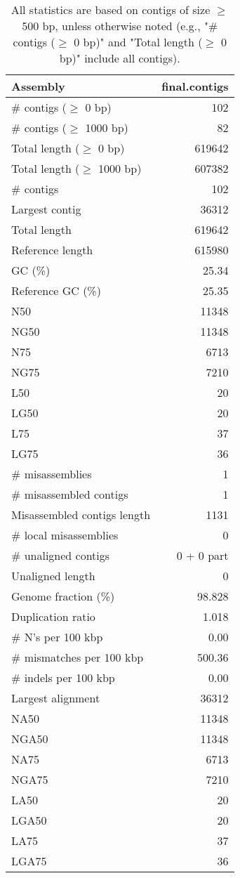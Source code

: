 \documentclass[12pt,a4paper]{article}
\begin{document}
\begin{table}[ht]
\begin{center}
\caption{All statistics are based on contigs of size $\geq$ 500 bp, unless otherwise noted (e.g., "\# contigs ($\geq$ 0 bp)" and "Total length ($\geq$ 0 bp)" include all contigs).}
\begin{tabular}{|l*{1}{|r}|}
\hline
Assembly & final.contigs \\ \hline
\# contigs ($\geq$ 0 bp) & 102 \\ \hline
\# contigs ($\geq$ 1000 bp) & 82 \\ \hline
Total length ($\geq$ 0 bp) & 619642 \\ \hline
Total length ($\geq$ 1000 bp) & 607382 \\ \hline
\# contigs & 102 \\ \hline
Largest contig & 36312 \\ \hline
Total length & 619642 \\ \hline
Reference length & 615980 \\ \hline
GC (\%) & 25.34 \\ \hline
Reference GC (\%) & 25.35 \\ \hline
N50 & 11348 \\ \hline
NG50 & 11348 \\ \hline
N75 & 6713 \\ \hline
NG75 & 7210 \\ \hline
L50 & 20 \\ \hline
LG50 & 20 \\ \hline
L75 & 37 \\ \hline
LG75 & 36 \\ \hline
\# misassemblies & 1 \\ \hline
\# misassembled contigs & 1 \\ \hline
Misassembled contigs length & 1131 \\ \hline
\# local misassemblies & 0 \\ \hline
\# unaligned contigs & 0 + 0 part \\ \hline
Unaligned length & 0 \\ \hline
Genome fraction (\%) & 98.828 \\ \hline
Duplication ratio & 1.018 \\ \hline
\# N's per 100 kbp & 0.00 \\ \hline
\# mismatches per 100 kbp & 500.36 \\ \hline
\# indels per 100 kbp & 0.00 \\ \hline
Largest alignment & 36312 \\ \hline
NA50 & 11348 \\ \hline
NGA50 & 11348 \\ \hline
NA75 & 6713 \\ \hline
NGA75 & 7210 \\ \hline
LA50 & 20 \\ \hline
LGA50 & 20 \\ \hline
LA75 & 37 \\ \hline
LGA75 & 36 \\ \hline
\end{tabular}
\end{center}
\end{table}
\end{document}
